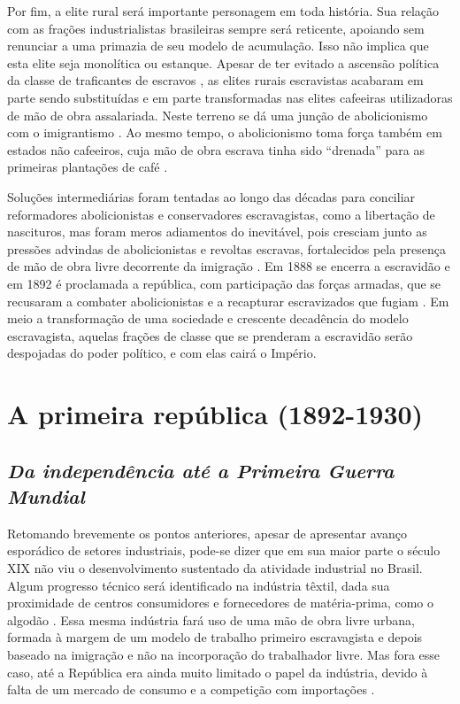 Por fim, a elite rural será importante personagem em toda história. Sua
relação com as frações industrialistas brasileiras sempre será
reticente, apoiando sem renunciar a uma primazia de seu modelo de
acumulação. Isso não implica que esta elite seja monolítica ou estanque.
Apesar de ter evitado a ascensão política da classe de traficantes de
escravos \citep{furtado_formacao_2005}, as elites rurais escravistas acabaram em parte sendo
substituídas e em parte transformadas nas elites cafeeiras utilizadoras
de mão de obra assalariada. Neste terreno se dá uma junção de
abolicionismo com o imigrantismo
\citep{mello1982}. Ao
mesmo tempo, o abolicionismo toma força também em estados não cafeeiros,
cuja mão de obra escrava tinha sido ``drenada'' para as primeiras
plantações de café
\citep{mello1982}.

Soluções intermediárias foram tentadas ao longo das décadas para
conciliar reformadores abolicionistas e conservadores escravagistas,
como a libertação de nascituros, mas foram meros adiamentos do inevitável,
pois cresciam junto as pressões advindas de abolicionistas e revoltas escravas, fortalecidos
pela presença de mão de obra livre decorrente da imigração
\citep{pradojunior2012}.
Em 1888 se encerra a escravidão e em 1892 é proclamada a república, com
participação das forças armadas, que se recusaram a combater
abolicionistas e a recapturar escravizados que fugiam
\citep{pradojunior2012}.
Em meio a transformação de uma sociedade e crescente decadência do
modelo escravagista, aquelas frações de classe que se prenderam a
escravidão serão despojadas do poder político, e com elas cairá o
Império.

\section{A primeira república (1892-1930)}\label{a-primeira-repuxfablica-1892-1930}
\subsection{\emph{Da independência até a Primeira Guerra Mundial}}

Retomando brevemente os pontos anteriores, apesar de apresentar avanço
esporádico de setores industriais, pode-se dizer que em sua maior parte
o século XIX não viu o desenvolvimento sustentado da atividade
industrial no Brasil. Algum progresso técnico será identificado na
indústria têxtil, dada sua proximidade de centros consumidores e
fornecedores de matéria-prima, como o algodão
\citep{pradojunior2012}.
Essa mesma indústria fará uso de uma mão de obra livre urbana, formada à
margem de um modelo de trabalho primeiro escravagista e depois baseado
na imigração e não na incorporação do trabalhador livre. Mas fora esse
caso, até a República era ainda muito limitado o papel da indústria,
devido à falta de um mercado de consumo e a competição com importações
\citep{pradojunior2012}.

